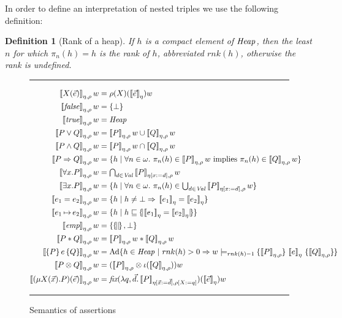 \documentclass{LMCS}
\newtheorem{definition}[theorem]{Definition}
\theoremstyle{remark}
\newcommand{\Val}{\ensuremath{\mathit{Val}}\xspace}
\newcommand{\record}[1]{\ensuremath{\left.\!\{\!|{#1}|\!\}\right.\!}}
\newcommand{\triple}[3]{{\ensuremath{\!\left.\{ #1 \}\, #2\, \{  #3 \}\!\right.}}}
\newcommand{\True}{\ensuremath{\mathit{true}}}
\newcommand{\False}{\ensuremath{\mathit{false}}}
\newcommand{\EMP}{\ensuremath{\textit{emp}}}
\newcommand{\den}[1]{\left\llbracket #1
  \right\rrbracket}
\newcommand{\FOLD}{\ensuremath{\iota}}
\begin{document}
In order to define an  interpretation of nested triples we   use the following definition:
\begin{definition}[Rank of  a heap]
If $h$ is a compact element of $\mathit{Heap}$, then the least $n$ for which $\pi_n(h) = h$ is the \emph{rank} of $h$, abbreviated $\textit{rnk}(h)$, otherwise the rank is undefined.
 \end{definition}

\begin{figure}[t]
\hrule
\begin{align*}
\den{X(\vec e)}_{\eta,\rho} w & =   \rho(X)(\den{\vec e}_\eta)w\\
\den{\False}_{\eta,\rho} w & =   \{\bot\}\\
\den{\True}_{\eta,\rho} w & =  \Heap\\
\den{P\vee Q}_{\eta,\rho} w & =   \den{P}_{\eta,\rho} w\cup\den{Q}_{\eta,\rho} w\\
\den{P\wedge Q}_{\eta,\rho} w & =  \den{P}_{\eta,\rho} w\cap\den{Q}_{\eta,\rho} w\\
\den{P \Rightarrow Q}_{\eta,\rho} w & = \{h\;|\;\forall n\in\omega.\ \pi_n(h)\in\den{P}_{\eta,\rho} w\ \text{implies}\ \pi_n(h)\in\den{Q}_{\eta,\rho} w\}\\
\den{\forall x.P}_{\eta,\rho} w & = \textstyle{\bigcap_{d\in\Val}} \den{P}_{\eta[x:=d],\rho}w\\
\den{\exists x.P}_{\eta,\rho} w & =  \{h\;|\; \forall n\in\omega.\ \pi_n(h)\in \textstyle{\bigcup_{d\in\Val}} \den{P}_{\eta[x:=d],\rho}w\}\\
\den{e_1=e_2}_{\eta,\rho} w & =\{h\;|\;h\neq\bot\Rightarrow\,\den{e_1}_\eta = \den{e_2}_\eta\}\\
\den{e_1\,{\mapsto}\, e_2}_{\eta,\rho} w & = \{h\;|\;h\sqsubseteq  \record{\den{e_1}_\eta  = \den{e_2}_{\eta}}\}\\
\den{\EMP}_{\eta,\rho} w & = \{\record{},\bot\}\\
\den{P*Q}_{\eta,\rho} w & =  \den{P}_{\eta,\rho} w * \den{Q}_{\eta,\rho} w\\
\den{\triple{P}{e}{Q}}_{\eta,\rho} w & = \DCl \{ h \in \Heap \ |\ rnk(h)>0 \Rightarrow  w\models_{rnk(h)-1} \triple{\den{P}_{\eta,\rho}}{\den{e}_\eta}{\den{Q}_{\eta,\rho}} \}\\
\den{P\otimes Q}_{\eta,\rho} w & =  ( \den{P}_{\eta,\rho}\otimes\FOLD(\den{Q}_{\eta,\rho}) ) w\\
\den{(\mu X(\vec x).P)(\vec e)}_{\eta,\rho} w & =  \textit{fix}(\lambda q,\vec d. \den{P}_{\eta[\vec x:=\vec d],\rho[X:=q]}) (\den{\vec e}_\eta)w
\end{align*}
\hrule
\caption{\label{fig:assertion-semantics}Semantics of assertions}
\end{figure}
\end{document}

